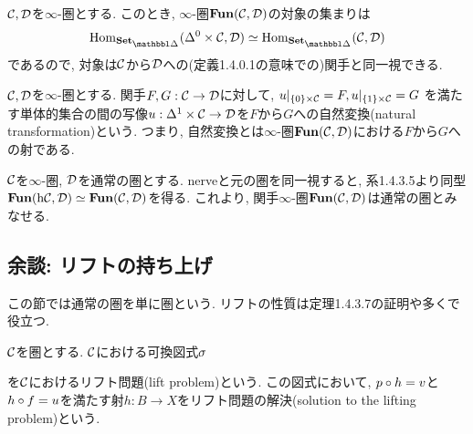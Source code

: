 \documentclass[uplatex, a4paper, 14Q, dvipdfmx]{jsreport}
\begin{document}
\begin{remark}
  $\mathcal{C}, \mathcal{D}$を$\infty$-圏とする. 
  このとき, $\infty$-圏$\mathbf{Fun}(\mathcal{C},\mathcal{D})$の対象の集まりは
  \begin{align*}
    \Hom_{\sset}(\Delta^0 \ti \calC,\calD) 
    \simeq \Hom_{\sset}(\calC,\calD) 
  \end{align*}
  であるので, 対象は$\mathcal{C}$から$\mathcal{D}$への(定義1.4.0.1の意味での)関手と同一視できる. 
\end{remark}

\begin{remark}
  $\mathcal{C}, \mathcal{D}$を$\infty$-圏とする.
  関手$F,G: \mathcal{C} \to \mathcal{D}$に対して, $u|_{\{0\} \times \mathcal{C}}=F, u|_{\{1\} \times \mathcal{C}}=G$
  を満たす単体的集合の間の写像$u: \Delta^1 \times \mathcal{C} \to \mathcal{D}$を$F$から$G$への自然変換(natural transformation)という.
  つまり, 自然変換とは$\infty$-圏$\mathbf{Fun}(\mathcal{C},\mathcal{D})$における$F$から$G$への射である. 
\end{remark}

\begin{remark}
  $\mathcal{C}$を$\infty$-圏, $\mathcal{D}$を通常の圏とする. 
  nerveと元の圏を同一視すると, 系1.4.3.5より同型$\mathbf{Fun}(\mathrm{h}\mathcal{C},\mathcal{D}) \simeq \mathbf{Fun}(\mathcal{C},\mathcal{D})$を得る. 
  これより, 関手$\infty$-圏$\mathbf{Fun}(\mathcal{C},\mathcal{D})$は通常の圏とみなせる.
\end{remark}

\subsection{余談: リフトの持ち上げ}

この節では通常の圏を単に圏という. 
リフトの性質は定理1.4.3.7の証明や多くで役立つ. 

\begin{definition}
  $\mathcal{C}$を圏とする. 
  $\mathcal{C}$における可換図式$\sigma$
  \begin{center}
  \end{center}
  を$\mathcal{C}$におけるリフト問題(lift problem)という. 
  この図式において, $p \circ h=v$と$h \circ f=u$を満たす射$h: B \to X$をリフト問題の解決(solution to the lifting problem)という. 
  \begin{center}
  \end{center}
\end{definition}
\end{document}
